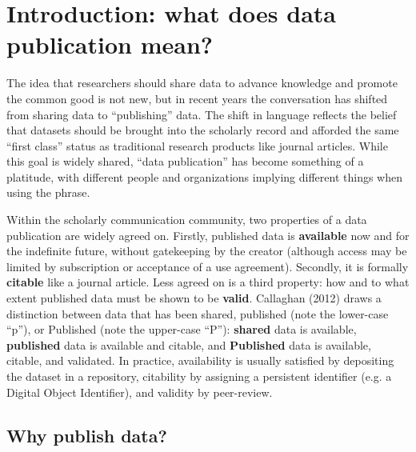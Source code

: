 \documentclass[10pt,twocolumn]{article}
\begin{document}
\section*{Introduction: what does data publication mean?}\label{introduction}

The idea that researchers should share data to advance knowledge and promote the common good is not new, but in recent years the conversation has shifted from sharing data to ``publishing'' data.\cite{costello_motivating_2009,smith_data_2009,lawrence_data_2011,sarah_callaghan_making_2012}
The shift in language reflects the belief that datasets should be brought into the scholarly record and afforded the same ``first class'' status as traditional research products like journal articles.  
While this goal is widely shared,  ``data publication'' has become something of a platitude, with different people and organizations implying different things when using the phrase.

Within the scholarly communication community, two properties of a data publication are widely agreed on.\cite{smith_data_2009,sarah_callaghan_making_2012}
Firstly, published data is \textbf{available} now and for the indefinite future, without gatekeeping by the creator (although access may be limited by subscription or acceptance of a use agreement).
Secondly, it is formally \textbf{citable} like a journal article.
Less agreed on is a third property: how and to what extent published data must be shown to be \textbf{valid}.
Callaghan (2012)\cite{sarah_callaghan_making_2012} draws a distinction between data that has been shared, published (note the lower-case “p”), or Published (note the upper-case “P”): \textbf{shared} data is available, \textbf{published} data is available and citable, and \textbf{Published} data is available, citable, and validated. 
In practice, availability is usually satisfied by depositing the dataset in a repository, citability by assigning a persistent identifier (e.g. a Digital Object Identifier), and validity by peer-review.

\subsection*{Why publish data?}\label{why-publish-data}
\end{document}
